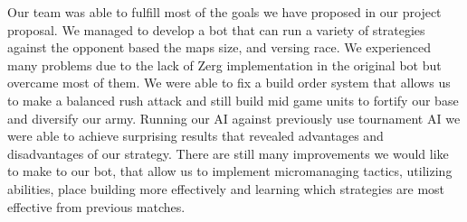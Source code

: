 \documentclass{article}
\begin{document}
Our team was able to fulfill most of the goals we have proposed in our project proposal. We managed to develop a bot that can run a variety of strategies against the opponent based the maps size, and versing race. We experienced many problems due to the lack of Zerg implementation in the original bot but overcame most of them. We were able to fix a build order system that allows us to make a balanced rush attack and still build mid game units to fortify our base and diversify our army. Running our AI against previously use tournament AI we were able to achieve surprising results that revealed advantages and disadvantages of our strategy. There are still many improvements we would like to make to our bot, that allow us to implement micromanaging tactics, utilizing abilities, place building more effectively and learning which strategies are most effective from previous matches. 


\printbibliography
\end{document}
